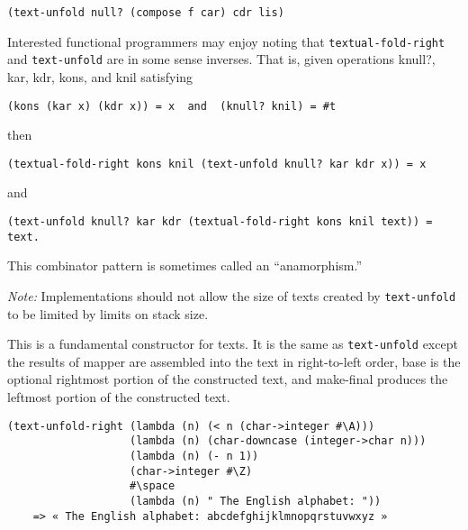 \begin{entry}{%
  }
\begin{verbatim}
(text-unfold null? (compose f car) cdr lis)
\end{verbatim}

Interested functional programmers may enjoy noting that
\texttt{textual-fold-right} and \texttt{text-unfold} are in some sense
inverses. That is, given operations knull?, kar, kdr, kons, and knil
satisfying

\begin{verbatim}
(kons (kar x) (kdr x)) = x  and  (knull? knil) = #t
\end{verbatim}

then

\begin{verbatim}
(textual-fold-right kons knil (text-unfold knull? kar kdr x)) = x
\end{verbatim}

and

\begin{verbatim}
(text-unfold knull? kar kdr (textual-fold-right kons knil text)) = text.
\end{verbatim}

This combinator pattern is sometimes called an ``anamorphism.''

\emph{Note:} Implementations should not allow the size of texts
created by \texttt{text-unfold} to be limited by limits on stack size.
\end{entry}

\begin{entry}{%
  }

  This is a fundamental
  constructor for texts. It is the same as \texttt{text-unfold} except
  the results of mapper are assembled into the text in right-to-left
  order, base is the optional rightmost portion of the constructed
  text, and make-final produces the leftmost portion of the
  constructed text.

\begin{verbatim}
(text-unfold-right (lambda (n) (< n (char->integer #\A)))
                   (lambda (n) (char-downcase (integer->char n)))
                   (lambda (n) (- n 1))
                   (char->integer #\Z)
                   #\space
                   (lambda (n) " The English alphabet: "))
    => « The English alphabet: abcdefghijklmnopqrstuvwxyz »
\end{verbatim}
\end{entry}

